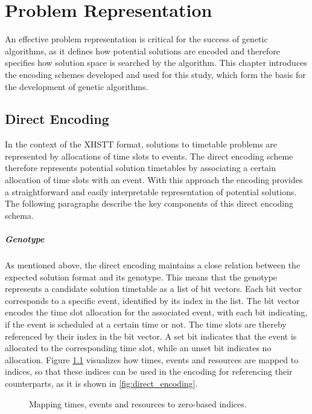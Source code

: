 \documentclass[english,examples]{isasthesis}
\begin{document}
\chapter{Problem Representation}
An effective problem representation is critical for the success of genetic
algorithms, as it defines how potential solutions are encoded and therefore
specifies how solution space is searched by the algorithm. This chapter
introduces the encoding schemes developed and used for this study, which form
the basis for the development of genetic algorithms.

\section{Direct Encoding}
In the context of the XHSTT format, solutions to timetable problems are
represented by allocations of time slots to events.
The direct encoding scheme therefore represents potential solution timetables
by associating a certain allocation of time slots with an event. With this
approach the encoding provides a straightforward and easily interpretable
representation of potential solutions. The following paragraphs describe the
key components of this direct encoding schema.

\paragraph{Genotype}
As mentioned above, the direct encoding maintains a close relation between
the expected solution format and its genotype. This means that the genotype
represents a candidate solution timetable as a list of bit vectors. Each bit
vector corresponds to a specific event, identified by its index in the list.
The bit vector encodes the time slot allocation for the associated event,
with each bit indicating, if the event is scheduled at a certain time
or not. The time slots are thereby referenced by their index in the bit vector.
A set bit indicates that the event is allocated to the corresponding time slot,
while an unset bit indicates no allocation.
Figure \ref{fig:index_map} visualizes how times, events and resources
are mapped to indices, so that these indices can be used in the encoding for
referencing their counterparts, as it is shown in \ref{fig:direct_encoding}.

\begin{figure}
    \centering
    

    \caption{
        Mapping times, events and resources to zero-based indices.
    }
    \label{fig:index_map}
\end{figure}
\end{document}
